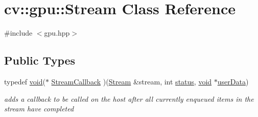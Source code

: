 \hypertarget{classcv_1_1gpu_1_1Stream}{\section{cv\-:\-:gpu\-:\-:Stream Class Reference}
\label{classcv_1_1gpu_1_1Stream}
}


{\ttfamily \#include $<$gpu.\-hpp$>$}

\subsection*{Public Types}
\begin{DoxyCompactItemize}
\item 
typedef \hyperlink{legacy_8hpp_a8bb47f092d473522721002c86c13b94e}{void}($\ast$ \hyperlink{classcv_1_1gpu_1_1Stream_aaf3251f51e57223ddd46c62bd63af3eb}{Stream\-Callback} )(\hyperlink{classcv_1_1gpu_1_1Stream}{Stream} \&stream, int \hyperlink{tracking_8hpp_ae17b3c2584dab511e91d1c96644018bf}{status}, \hyperlink{legacy_8hpp_a8bb47f092d473522721002c86c13b94e}{void} $\ast$\hyperlink{legacy_8hpp_ae6d7787b8c860038ffa2f009134ec73e}{user\-Data})
\begin{DoxyCompactList}\small\item\em adds a callback to be called on the host after all currently enqueued items in the stream have completed \end{DoxyCompactList}\end{DoxyCompactItemize}
